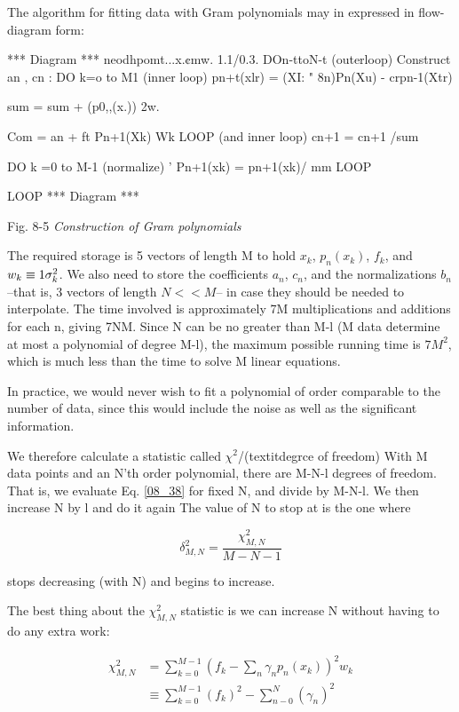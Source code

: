 The algorithm for fitting data with Gram polynomials may in expressed in flow-diagram form:

*** Diagram ***
neodhpomt...x.¢mw. 1.1/0.3.
DOn-ttoN-t (outerloop)
Construct an , cn :
DO k=o to M1 (inner loop)
pn+t(xlr) = (XI: " 8n)Pn(Xu) - crpn-1(Xtr)

sum = sum + (p0,,(x.)) 2w.

Com = an + ft Pn+1(Xk) Wk
LOOP (and inner loop)
cn+1 = cn+1 /sum

DO k =0 to M-1 (normalize)
’ Pn+1(xk) = pn+1(xk)/ mm
LOOP

LOOP
*** Diagram ***

Fig. 8-5 \textit{Construction of Gram polynomials}

The required storage is 5 vectors of length M to hold $x_{k}$, $p_{n}(x_{k})$, $f_{k}$, and $w_{k} \equiv 1\/\sigma_{k}^{2}$. We also need to store the coefficients $a_{n}$, $c_{n}$, and the normalizations $b_{n}$ --that is, 3 vectors of length $N<<M$-- in case they should be needed to interpolate. The time involved is approximately 7M multiplications and additions for each n, giving 7NM. Since N can be no greater than M-l (M data determine at most a polynomial of degree M-l), the maximum possible running time is $7M^{2}$, which is much less than the time to solve M linear equations.

In practice, we would never wish to fit a polynomial of order comparable to the number of data, since this would include the noise as well as the significant information.

We therefore calculate a statistic called $\chi^{2}$/(textit{degrce of freedom}) With M data points and an N'th order polynomial, there are M-N-l degrees of freedom. That is, we evaluate Eq. \ref{08_38} for fixed N, and divide by M-N-l. We then increase N by l and do it again The value of N to stop at is the one where

\begin{equation*}
\delta_{M,N}^{2} = \frac{\chi_{M,N}^{2}}{M-N-1}
\end{equation*}

stops decreasing (with N) and begins to increase.

The best thing about the $\chi_{M,N}^{2}$ statistic is we can increase N without having to do any extra work:

\begin{equation}\label{eq:08_47}
    \begin{split}
        \chi_{M,N}^{2} &= \sum_{k=0}^{M-1} (f_{k} - \sum_{n} \gamma_{n}p_{n}(x_{k}))^2 w_{k} \\
        &\equiv \sum_{k=0}^{M-1} (f_{k})^{2} - \sum_{n-0}^{N} (\gamma_{n})^2
    \end{split}
\end{equation}

